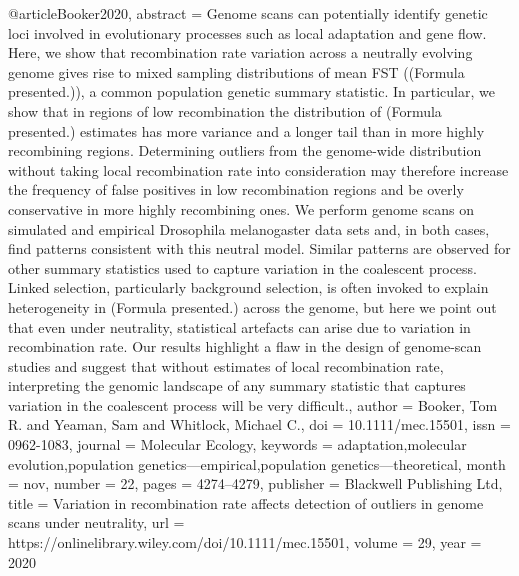 @article{Booker2020,
abstract = {Genome scans can potentially identify genetic loci involved in evolutionary processes such as local adaptation and gene flow. Here, we show that recombination rate variation across a neutrally evolving genome gives rise to mixed sampling distributions of mean FST ((Formula presented.)), a common population genetic summary statistic. In particular, we show that in regions of low recombination the distribution of (Formula presented.) estimates has more variance and a longer tail than in more highly recombining regions. Determining outliers from the genome-wide distribution without taking local recombination rate into consideration may therefore increase the frequency of false positives in low recombination regions and be overly conservative in more highly recombining ones. We perform genome scans on simulated and empirical Drosophila melanogaster data sets and, in both cases, find patterns consistent with this neutral model. Similar patterns are observed for other summary statistics used to capture variation in the coalescent process. Linked selection, particularly background selection, is often invoked to explain heterogeneity in (Formula presented.) across the genome, but here we point out that even under neutrality, statistical artefacts can arise due to variation in recombination rate. Our results highlight a flaw in the design of genome-scan studies and suggest that without estimates of local recombination rate, interpreting the genomic landscape of any summary statistic that captures variation in the coalescent process will be very difficult.},
author = {Booker, Tom R. and Yeaman, Sam and Whitlock, Michael C.},
doi = {10.1111/mec.15501},
issn = {0962-1083},
journal = {Molecular Ecology},
keywords = {adaptation,molecular evolution,population genetics—empirical,population genetics—theoretical},
month = {nov},
number = {22},
pages = {4274--4279},
publisher = {Blackwell Publishing Ltd},
title = {{Variation in recombination rate affects detection of outliers in genome scans under neutrality}},
url = {https://onlinelibrary.wiley.com/doi/10.1111/mec.15501},
volume = {29},
year = {2020}
}
